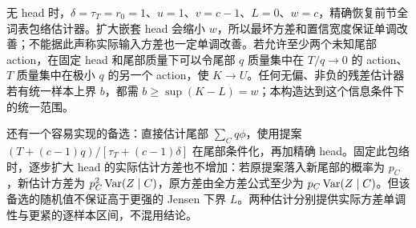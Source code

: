 无 head 时，$\delta=\tau_T=r_0=1$、$u=1$、$v=c-1$、$L=0$、$w=c$，精确恢复前节全词表包络估计器。扩大嵌套 head 会缩小 $w$，所以最坏方差和置信宽度保证单调改善；不能据此声称实际输入方差也一定单调改善。若允许至少两个未知尾部 action，在固定 head 和尾部质量下可以令尾部 $q$ 质量集中在 $T/q\to0$ 的 action、$T$ 质量集中在极小 $q$ 的另一个 action，使 $K\to U$。任何无偏、非负的残差估计器若有统一样本上界 $b$，都需 $b\ge\sup(K-L)=w$；本构造达到这个信息条件下的统一范围。

还有一个容易实现的备选：直接估计尾部 $\sum_Cq\phi$，使用提案 $(T+(c-1)q)/[\tau_T+(c-1)\delta]$ 在尾部条件化，再加精确 head。固定此包络时，逐步扩大 head 的实际估计方差也不增加：若原提案落入新尾部的概率为 $p_C$，新估计方差为 $p_C^2\operatorname{Var}(Z\mid C)$，原方差由全方差公式至少为 $p_C\operatorname{Var}(Z\mid C)$。但该备选的随机值不保证高于更强的 Jensen 下界 $L$。两种估计分别提供实际方差单调性与更紧的逐样本区间，不混用结论。
